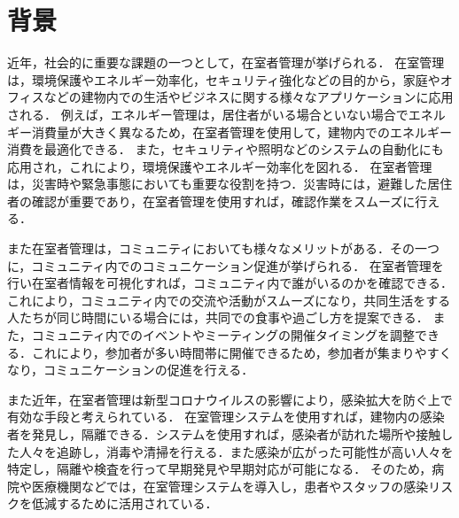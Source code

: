 





\section{背景}\label{1.1}
近年，社会的に重要な課題の一つとして，在室者管理が挙げられる．
在室管理は，環境保護やエネルギー効率化，セキュリティ強化などの目的から，家庭やオフィスなどの建物内での生活やビジネスに関する様々なアプリケーションに応用される．
例えば，エネルギー管理は，居住者がいる場合といない場合でエネルギー消費量が大きく異なるため，在室者管理を使用して，建物内でのエネルギー消費を最適化できる．
また，セキュリティや照明などのシステムの自動化にも応用され，これにより，環境保護やエネルギー効率化を図れる．
在室者管理は，災害時や緊急事態においても重要な役割を持つ．災害時には，避難した居住者の確認が重要であり，在室者管理を使用すれば，確認作業をスムーズに行える．

また在室者管理は，コミュニティにおいても様々なメリットがある．その一つに，コミュニティ内でのコミュニケーション促進が挙げられる．
在室者管理を行い在室者情報を可視化すれば，コミュニティ内で誰がいるのかを確認できる．これにより，コミュニティ内での交流や活動がスムーズになり，共同生活をする人たちが同じ時間にいる場合には，共同での食事や過ごし方を提案できる．
また，コミュニティ内でのイベントやミーティングの開催タイミングを調整できる．これにより，参加者が多い時間帯に開催できるため，参加者が集まりやすくなり，コミュニケーションの促進を行える．


また近年，在室者管理は新型コロナウイルスの影響により，感染拡大を防ぐ上で有効な手段と考えられている．
在室管理システムを使用すれば，建物内の感染者を発見し，隔離できる．システムを使用すれば，感染者が訪れた場所や接触した人々を追跡し，消毒や清掃を行える．また感染が広がった可能性が高い人々を特定し，隔離や検査を行って早期発見や早期対応が可能になる．
そのため，病院や医療機関などでは，在室管理システムを導入し，患者やスタッフの感染リスクを低減するために活用されている．

